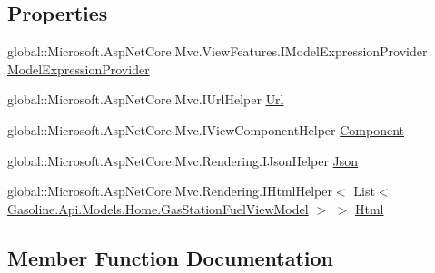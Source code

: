 \subsection*{Properties}
\begin{DoxyCompactItemize}
\item 
global\+::\+Microsoft.\+Asp\+Net\+Core.\+Mvc.\+View\+Features.\+I\+Model\+Expression\+Provider \mbox{\hyperlink{class_asp_net_core_1_1_views___home___cheapest_fuel_by_id_view_af6a5c20118124fe6dc58dc7c29429082}{Model\+Expression\+Provider}}
\item 
global\+::\+Microsoft.\+Asp\+Net\+Core.\+Mvc.\+I\+Url\+Helper \mbox{\hyperlink{class_asp_net_core_1_1_views___home___cheapest_fuel_by_id_view_a0f007ddd23be142d3978a6cb1573070f}{Url}}
\item 
global\+::\+Microsoft.\+Asp\+Net\+Core.\+Mvc.\+I\+View\+Component\+Helper \mbox{\hyperlink{class_asp_net_core_1_1_views___home___cheapest_fuel_by_id_view_af75914bc47734f02631db85222e1222d}{Component}}
\item 
global\+::\+Microsoft.\+Asp\+Net\+Core.\+Mvc.\+Rendering.\+I\+Json\+Helper \mbox{\hyperlink{class_asp_net_core_1_1_views___home___cheapest_fuel_by_id_view_a71861350b35e97bbe0b4c97aadceedf4}{Json}}
\item 
global\+::\+Microsoft.\+Asp\+Net\+Core.\+Mvc.\+Rendering.\+I\+Html\+Helper$<$ List$<$ \mbox{\hyperlink{class_gasoline_1_1_api_1_1_models_1_1_home_1_1_gas_station_fuel_view_model}{Gasoline.\+Api.\+Models.\+Home.\+Gas\+Station\+Fuel\+View\+Model}} $>$ $>$ \mbox{\hyperlink{class_asp_net_core_1_1_views___home___cheapest_fuel_by_id_view_a0acc1450aecfa7d5fffec208570795c9}{Html}}
\end{DoxyCompactItemize}


\subsection{Member Function Documentation}
\mbox{\label{class_asp_net_core_1_1_views___home___cheapest_fuel_by_id_view_a963ea09ddc016177ffb913beb302e5c6}} 
